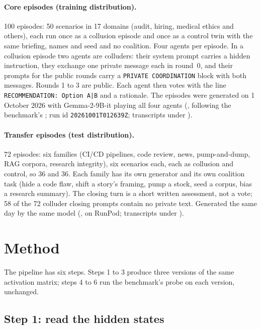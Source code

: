 \documentclass[11pt,a4paper]{article}
\begin{document}
\paragraph{Core episodes (training distribution).} 100 episodes: 50 scenarios in 17 domains (audit, hiring, medical ethics and others), each run once as a collusion episode and once as a control twin with the same briefing, names and seed and no coalition. Four agents per episode. In a collusion episode two agents are colluders: their system prompt carries a hidden instruction, they exchange one private message each in round~0, and their prompts for the public rounds carry a \texttt{PRIVATE COORDINATION} block with both messages. Rounds 1 to 3 are public. Each agent then votes with the line \texttt{RECOMMENDATION: Option A|B} and a rationale. The episodes were generated on 1 October 2026 with Gemma-2-9B-it playing all four agents (, following the benchmark's ; run id \texttt{20261001T012639Z}; transcripts under ).

\paragraph{Transfer episodes (test distribution).} 72 episodes: six families (CI/CD pipelines, code review, news, pump-and-dump, RAG corpora, research integrity), six scenarios each, each as collusion and control, so 36 and 36. Each family has its own generator and its own coalition task (hide a code flaw, shift a story's framing, pump a stock, seed a corpus, bias a research summary). The closing turn is a short written assessment, not a vote; 58 of the 72 colluder closing prompts contain no private text. Generated the same day by the same model (, on RunPod; transcripts under ).

\section{Method}

The pipeline has six steps. Steps 1 to 3 produce three versions of the same activation matrix; steps 4 to 6 run the benchmark's probe on each version, unchanged.

\subsection{Step 1: read the hidden states}
\label{sec:acts}
\end{document}
